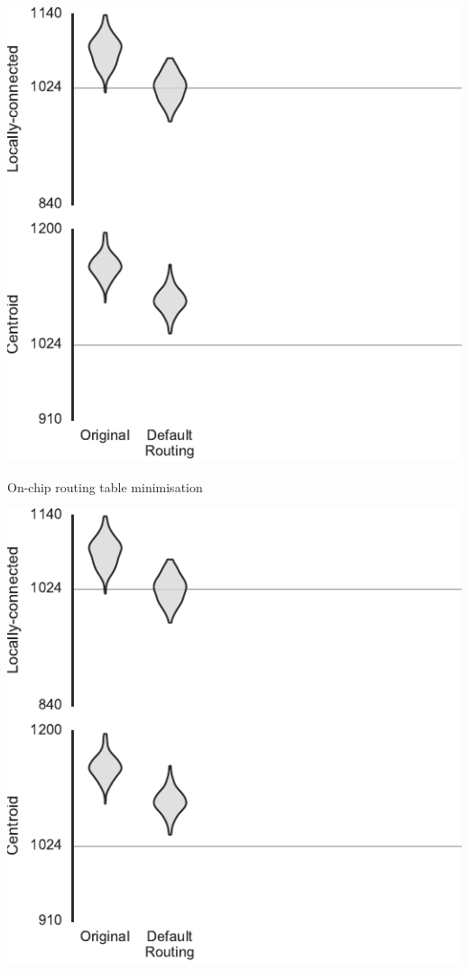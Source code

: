 \documentclass[t]{beamer}
\begin{document}
\begin{frame}[plain]{}
  \begin{center}
    \includegraphics[page=3]{../experiments/presentation_plots}
  \end{center}
\end{frame}

\begin{frame}{On-chip routing table minimisation}  %
\end{frame}

\begin{frame}[plain]{}
  \begin{center}
    \includegraphics[page=4]{../experiments/presentation_plots}
  \end{center}
\end{frame}
\end{document}
